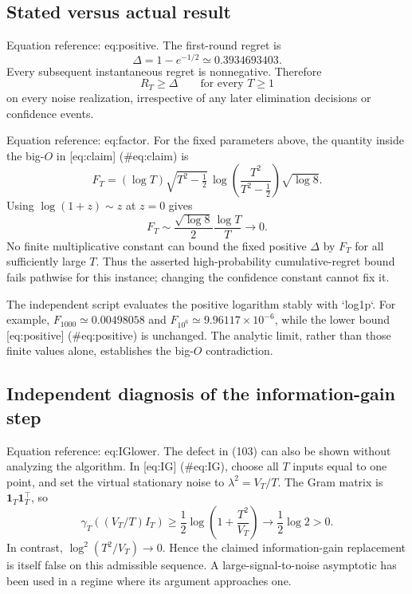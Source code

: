 \documentclass[10pt]{article}
\begin{document}
\subsection*{Stated versus actual result}
Equation reference: eq:positive. The first-round regret is \[
 \Delta=1-e^{-1/2}\simeq0.3934693403.\] Every subsequent instantaneous regret is nonnegative. Therefore \[R_T\ge\Delta\qquad\text{for every }T\ge1\] on every noise realization, irrespective of any later elimination decisions or confidence events.\par
Equation reference: eq:factor. For the fixed parameters above, the quantity inside the big-\(O\) in [eq:claim] (\#eq:claim) is \[
 F_T=(\log T)\sqrt{T^2-\tfrac12}\,
          \log\!\left(\frac{T^2}{T^2-\tfrac12}\right)\sqrt{\log8}.\] Using \(\log(1+z)\sim z\) at \(z=0\) gives \[F_T\sim\frac{\sqrt{\log8}}{2}\frac{\log T}{T}
       \longrightarrow0.\] No finite multiplicative constant can bound the fixed positive \(\Delta\) by \(F_T\) for all sufficiently large \(T\). Thus the asserted high-probability cumulative-regret bound fails pathwise for this instance; changing the confidence constant cannot fix it.\par
The independent script evaluates the positive logarithm stably with `log1p`. For example, \(F_{1000}\simeq0.00498058\) and \(F_{10^6}\simeq9.96117\times10^{-6}\), while the lower bound [eq:positive] (\#eq:positive) is unchanged. The analytic limit, rather than those finite values alone, establishes the big-\(O\) contradiction.\par
\subsection*{Independent diagnosis of the information-gain step}
Equation reference: eq:IGlower. The defect in (103) can also be shown without analyzing the algorithm. In [eq:IG] (\#eq:IG), choose all \(T\) inputs equal to one point, and set the virtual stationary noise to \(\lambda^2=V_T/T\). The Gram matrix is \(\mathbf1_T\mathbf1_T^\top\), so \[
 \gamma_T((V_T/T)I_T)
 \ge\frac12\log\!\left(1+\frac{T^2}{V_T}\right)
 \longrightarrow\frac12\log2>0.\] In contrast, \(\log^2(T^2/V_T)\to0\). Hence the claimed information-gain replacement is itself false on this admissible sequence. A large-signal-to-noise asymptotic has been used in a regime where its argument approaches one.\par
\end{document}
